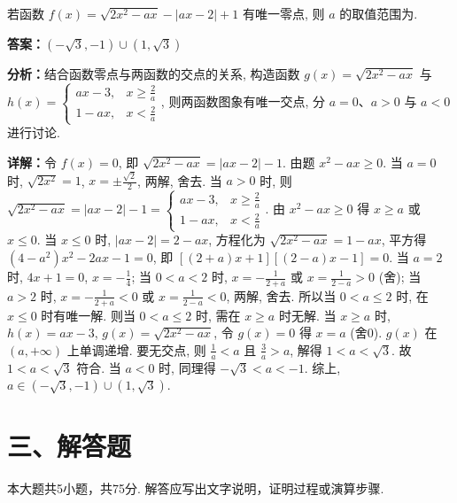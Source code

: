 \begin{question}[points=5]
若函数 $f(x)=\sqrt{2x^2-ax} - |ax-2| + 1$ 有唯一零点, 则 $a$ 的取值范围为.
\begin{solution}
\textbf{答案：}$(-\sqrt{3},-1)\cup(1,\sqrt{3})$

\textbf{分析：}结合函数零点与两函数的交点的关系, 构造函数 $g(x)=\sqrt{2x^2-ax}$ 与 $h(x)=\begin{cases} ax-3, & x\geq\frac{2}{a} \\ 1-ax, & x<\frac{2}{a} \end{cases}$, 则两函数图象有唯一交点, 分 $a=0$、$a>0$ 与 $a<0$ 进行讨论.

\textbf{详解：}令 $f(x)=0$, 即 $\sqrt{2x^2-ax}=|ax-2|-1$. 由题 $x^2-ax\geq0$. 当 $a=0$ 时, $\sqrt{2x^2}=1$, $x=\pm\frac{\sqrt{2}}{2}$, 两解, 舍去. 当 $a>0$ 时, 则 $\sqrt{2x^2-ax}=|ax-2|-1=\begin{cases} ax-3, & x\geq\frac{2}{a}\\ 1-ax, & x<\frac{2}{a} \end{cases}$. 由 $x^2-ax\geq0$ 得 $x\geq a$ 或 $x\leq0$. 当 $x\leq0$ 时, $|ax-2|=2-ax$, 方程化为 $\sqrt{2x^2-ax}=1-ax$, 平方得 $(4-a^2)x^2-2ax-1=0$, 即 $[(2+a)x+1][(2-a)x-1]=0$. 当 $a=2$ 时, $4x+1=0$, $x=-\frac{1}{4}$; 当 $0<a<2$ 时, $x=-\frac{1}{2+a}$ 或 $x=\frac{1}{2-a}>0$ (舍); 当 $a>2$ 时, $x=-\frac{1}{2+a}<0$ 或 $x=\frac{1}{2-a}<0$, 两解, 舍去. 所以当 $0<a\leq2$ 时, 在 $x\leq0$ 时有唯一解. 则当 $0<a\leq2$ 时, 需在 $x\geq a$ 时无解. 当 $x\geq a$ 时, $h(x)=ax-3$, $g(x)=\sqrt{2x^2-ax}$, 令 $g(x)=0$ 得 $x=a$ (舍0). $g(x)$ 在 $(a,+\infty)$ 上单调递增. 要无交点, 则 $\frac{1}{a}<a$ 且 $\frac{3}{a}>a$, 解得 $1<a<\sqrt{3}$. 故 $1<a<\sqrt{3}$ 符合. 当 $a<0$ 时, 同理得 $-\sqrt{3}<a<-1$. 综上, $a\in(-\sqrt{3},-1)\cup(1,\sqrt{3})$.
\end{solution}
\end{question}

\section*{三、解答题}
本大题共5小题，共75分. 解答应写出文字说明，证明过程或演算步骤.


